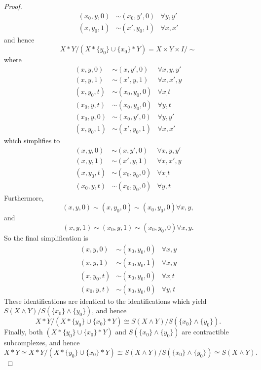 \documentclass{article}
\begin{document}
\begin{proof}
\begin{align*}
(x_0,y,0)&\sim(x_0,y',0)&\forall y,y'\\(x,y_0,1)&\sim(x',y_0,1)&\forall x,x'
\end{align*}and hence\[X*Y/(X*\{y_0\}\cup\{x_0\}*Y)=X\times Y\times I/\sim\]where\begin{align*}
(x,y,0)&\sim(x,y',0)&\forall x,y,y'\\(x,y,1)&\sim(x',y,1)&\forall x,x',y\\(x,y_0,t)&\sim(x_0,y_0,0)&\forall x_,t\\(x_0,y,t)&\sim(x_0,y_0,0)&\forall y,t\\(x_0,y,0)&\sim(x_0,y',0)&\forall y,y'\\(x,y_0,1)&\sim(x',y_0,1)&\forall x,x'
\end{align*} which simplifies to \begin{align*}
(x,y,0)&\sim(x,y',0)&\forall x,y,y'\\(x,y,1)&\sim(x',y,1)&\forall x,x',y\\(x,y_0,t)&\sim(x_0,y_0,0)&\forall x_,t\\(x_0,y,t)&\sim(x_0,y_0,0)&\forall y,t
\end{align*}Furthermore,\[(x,y,0)\sim(x,y_0,0)\sim(x_0,y_0,0)\forall x,y,\] and \[(x,y,1)\sim(x_0,y,1)\sim(x_0,y_0,0)\forall x,y.\] So the final simplification is\begin{align*}
(x,y,0)&\sim(x_0,y_0,0)&\forall x,y\\(x,y,1)&\sim(x_0,y_0,1)&\forall x,y\\(x,y_0,t)&\sim(x_0,y_0,0)&\forall x_,t\\(x_0,y,t)&\sim(x_0,y_0,0)&\forall y,t
\end{align*}These identifications are identical to the identifications which yield $S(X\wedge Y)/S(\{x_0\}\wedge\{y_0\})$, and hence \[X*Y/(X*\{y_0\}\cup\{x_0\}*Y)\cong S(X\wedge Y)/S(\{x_0\}\wedge\{y_0\}).\]
Finally, both $(X*\{y_0\}\cup\{x_0\}*Y)$ and $S(\{x_0\}\wedge\{y_0\})$ are contractible subcomplexes, and hence\[X*Y\simeq X*Y/(X*\{y_0\}\cup\{x_0\}*Y)\cong S(X\wedge Y)/S(\{x_0\}\wedge\{y_0\})\simeq S(X\wedge Y).\]
\end{proof}
\end{document}
